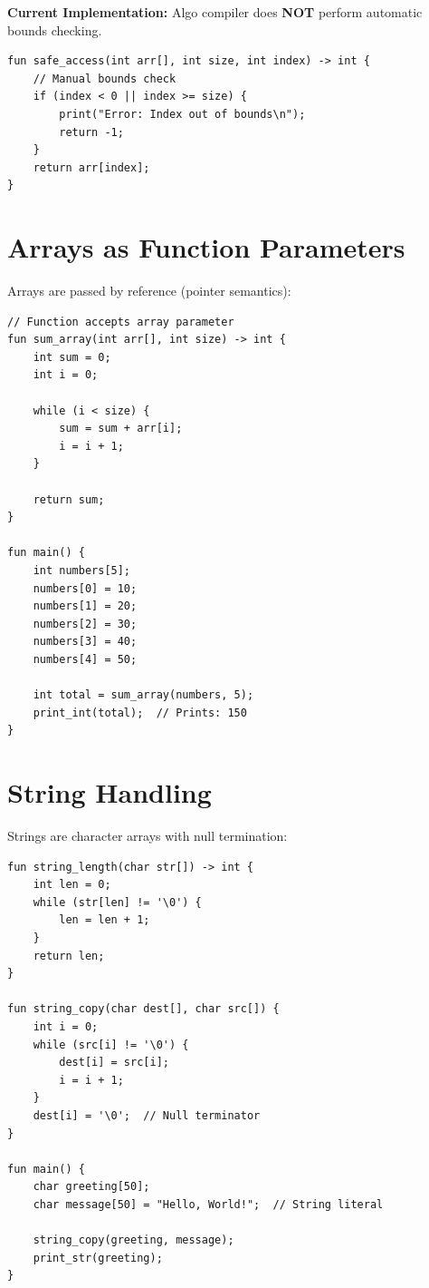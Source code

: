 \documentclass[12pt,a4paper,oneside]{book}
\begin{document}
\textbf{Current Implementation:} Algo compiler does \textbf{NOT} perform automatic bounds checking.

\begin{lstlisting}[style=algo, caption={Array Bounds - Manual Checking Required}]
fun safe_access(int arr[], int size, int index) -> int {
    // Manual bounds check
    if (index < 0 || index >= size) {
        print("Error: Index out of bounds\n");
        return -1;
    }
    return arr[index];
}
\end{lstlisting}

\section{Arrays as Function Parameters}

Arrays are passed by reference (pointer semantics):

\begin{lstlisting}[style=algo, caption={Passing Arrays to Functions}]
// Function accepts array parameter
fun sum_array(int arr[], int size) -> int {
    int sum = 0;
    int i = 0;
    
    while (i < size) {
        sum = sum + arr[i];
        i = i + 1;
    }
    
    return sum;
}

fun main() {
    int numbers[5];
    numbers[0] = 10;
    numbers[1] = 20;
    numbers[2] = 30;
    numbers[3] = 40;
    numbers[4] = 50;
    
    int total = sum_array(numbers, 5);
    print_int(total);  // Prints: 150
}
\end{lstlisting}

\section{String Handling}

Strings are character arrays with null termination:

\begin{lstlisting}[style=algo, caption={String Operations}]
fun string_length(char str[]) -> int {
    int len = 0;
    while (str[len] != '\0') {
        len = len + 1;
    }
    return len;
}

fun string_copy(char dest[], char src[]) {
    int i = 0;
    while (src[i] != '\0') {
        dest[i] = src[i];
        i = i + 1;
    }
    dest[i] = '\0';  // Null terminator
}

fun main() {
    char greeting[50];
    char message[50] = "Hello, World!";  // String literal
    
    string_copy(greeting, message);
    print_str(greeting);
}
\end{lstlisting}
\end{document}
